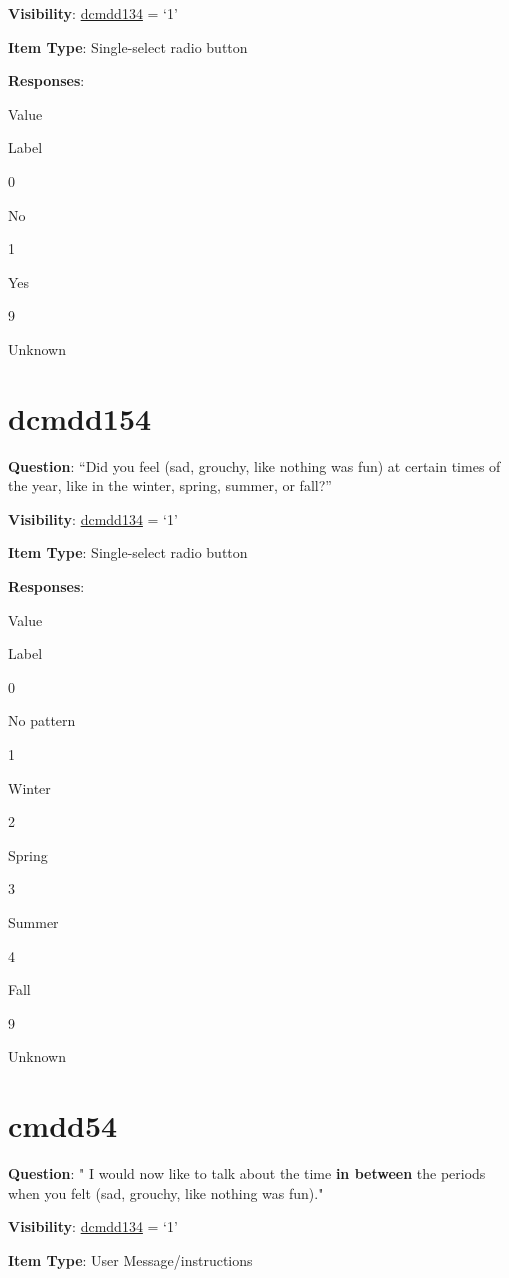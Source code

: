 \documentclass[]{book}
\begin{document}
\textbf{Visibility}: \protect\hyperlink{dcmdd134}{dcmdd134} = `1'

\textbf{Item Type}: Single-select radio button

\textbf{Responses}:

Value

Label

0

No

1

Yes

9

Unknown

\hypertarget{dcmdd154}{%
\section{dcmdd154}\label{dcmdd154}}

\textbf{Question}: ``Did you feel (sad, grouchy, like nothing was fun) at certain times of the year, like in the winter, spring, summer, or fall?''

\textbf{Visibility}: \protect\hyperlink{dcmdd134}{dcmdd134} = `1'

\textbf{Item Type}: Single-select radio button

\textbf{Responses}:

Value

Label

0

No pattern

1

Winter

2

Spring

3

Summer

4

Fall

9

Unknown

\hypertarget{cmdd54}{%
\section{cmdd54}\label{cmdd54}}

\textbf{Question}: "
I would now like to talk about the time \textbf{in between} the periods when you felt (sad, grouchy, like nothing was fun)."

\textbf{Visibility}: \protect\hyperlink{dcmdd134}{dcmdd134} = `1'

\textbf{Item Type}: User Message/instructions
\end{document}
